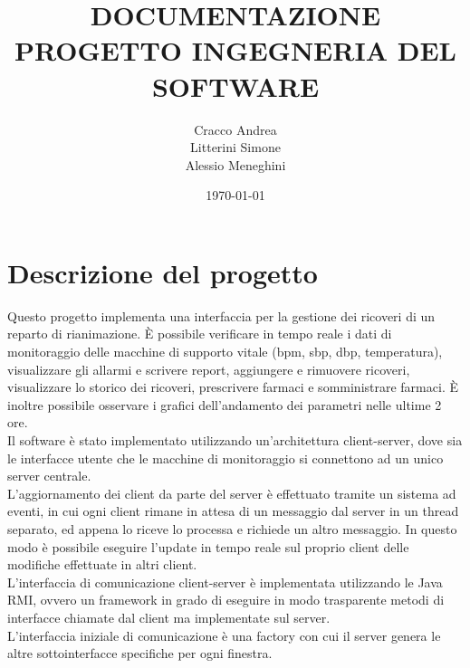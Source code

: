 \documentclass{article}
\begin{document}
\title{DOCUMENTAZIONE PROGETTO INGEGNERIA DEL SOFTWARE}

\author{Cracco Andrea\\Litterini Simone\\Alessio Meneghini }

\date{\today}

\maketitle

\vspace{1.5cm}

\newpage


\section{Descrizione del progetto}

Questo progetto implementa una interfaccia per la gestione dei ricoveri di un reparto di rianimazione.
\`E possibile verificare in tempo reale i dati di monitoraggio delle macchine di supporto vitale (bpm, sbp, dbp, temperatura),
visualizzare gli allarmi e scrivere report, aggiungere e rimuovere ricoveri, visualizzare lo storico dei ricoveri,
prescrivere farmaci e somministrare farmaci.
\`E inoltre possibile osservare i grafici dell'andamento dei parametri nelle ultime 2 ore.\\

Il software \`e stato implementato utilizzando un'architettura client-server, dove sia le interfacce utente che le macchine
di monitoraggio si connettono ad un unico server centrale.\\

L'aggiornamento dei client da parte del server \`e effettuato tramite un sistema ad eventi, in cui ogni client rimane in attesa
di un messaggio dal server in un thread separato, ed appena lo riceve lo processa e richiede un altro messaggio.
In questo modo \`e possibile eseguire l'update in tempo reale sul proprio client delle modifiche effettuate in altri client.\\

L'interfaccia di comunicazione client-server \`e implementata utilizzando le Java RMI, ovvero un framework in grado di eseguire
in modo trasparente metodi di interfacce chiamate dal client ma implementate sul server.\\

L'interfaccia iniziale di comunicazione \`e una factory con cui il server genera le altre sottointerfacce specifiche per ogni finestra.\\
\end{document}
